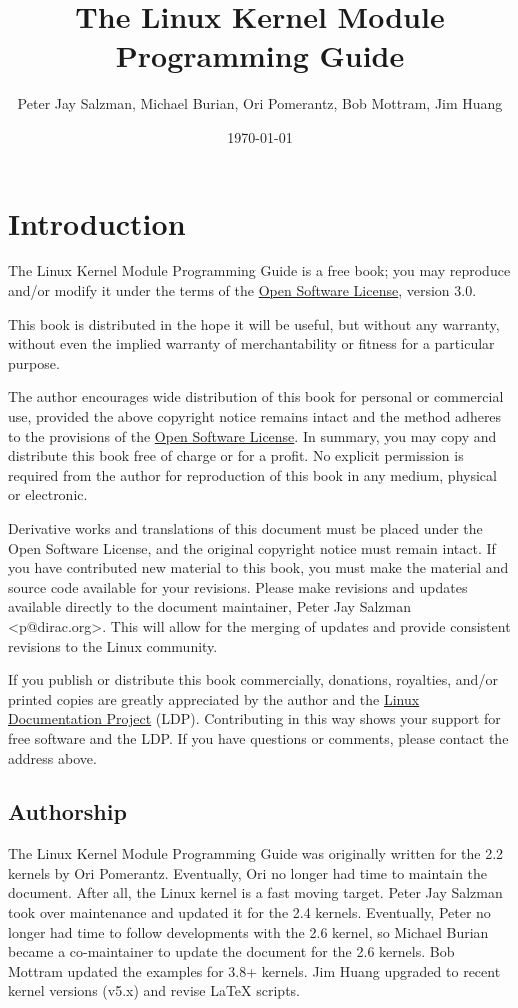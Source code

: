 \documentclass[10pt, oneside]{book}
\author{Peter Jay Salzman, Michael Burian, Ori Pomerantz, Bob Mottram, Jim Huang}
\date{\today}
\title{The Linux Kernel Module Programming Guide}
\begin{document}
\maketitle
\tableofcontents

\section{Introduction}
\label{sec:introduction}
The Linux Kernel Module Programming Guide is a free book; you may reproduce and/or modify it under the terms of the \href{https://opensource.org/licenses/OSL-3.0}{Open Software License}, version 3.0.

This book is distributed in the hope it will be useful, but without any warranty, without even the implied warranty of merchantability or fitness for a particular purpose.

The author encourages wide distribution of this book for personal or commercial use, provided the above copyright notice remains intact and the method adheres to the provisions of the \href{https://opensource.org/licenses/OSL-3.0}{Open Software License}.
In summary, you may copy and distribute this book free of charge or for a profit. No explicit permission is required from the author for reproduction of this book in any medium, physical or electronic.

Derivative works and translations of this document must be placed under the Open Software License, and the original copyright notice must remain intact.
If you have contributed new material to this book, you must make the material and source code available for your revisions.
Please make revisions and updates available directly to the document maintainer, Peter Jay Salzman <p@dirac.org>.
This will allow for the merging of updates and provide consistent revisions to the Linux community.

If you publish or distribute this book commercially, donations, royalties, and/or printed copies are greatly appreciated by the author and the \href{http://www.tldp.org}{Linux Documentation Project} (LDP).
Contributing in this way shows your support for free software and the LDP. If you have questions or comments, please contact the address above.

\subsection{Authorship}
\label{sec:authorship}

The Linux Kernel Module Programming Guide was originally written for the 2.2 kernels by Ori Pomerantz.
Eventually, Ori no longer had time to maintain the document.
After all, the Linux kernel is a fast moving target. Peter Jay Salzman took over maintenance and updated it for the 2.4 kernels.
Eventually, Peter no longer had time to follow developments with the 2.6 kernel, so Michael Burian became a co-maintainer to update the document for the 2.6 kernels.
Bob Mottram updated the examples for 3.8+ kernels.
Jim Huang upgraded to recent kernel versions (v5.x) and revise LaTeX scripts.
\end{document}

